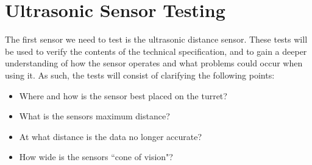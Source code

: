 \section{Ultrasonic Sensor Testing}\label{SensorTest}
The first sensor we need to test is the ultrasonic distance sensor. These tests
will be used to verify the contents of the technical specification, and
to gain a deeper understanding of how the sensor operates and what
problems could occur when using it. As such, the tests will consist of
clarifying the following points:
\begin{itemize}
  \item Where and how is the sensor best placed on the turret?
  \item What is the sensors maximum distance?
  \item At what distance is the data no longer accurate?
  \item How wide is the sensors ``cone of vision"?
\end{itemize}

%

%


